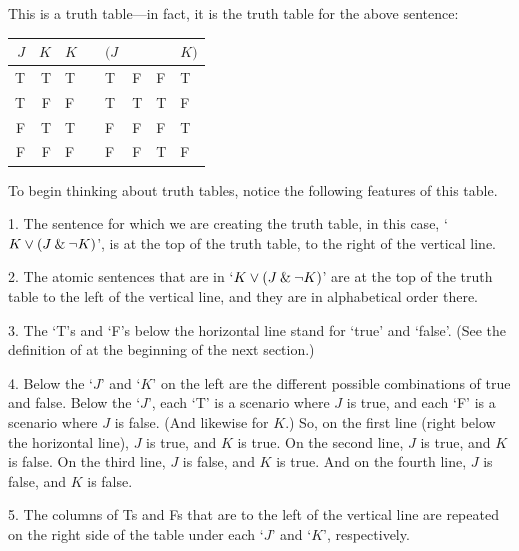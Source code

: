 This is a truth table---in fact, it is the truth table for the above sentence:

\begin{center}
\begin{tabular}{d d | f e e e e e}
$J$&$K$&  	$K$&\eor&$(J$&\eand&\enot&$K)$\\
\hline
 T & T & 	{T} & & {T} &F &F & {T}\Tstrut\\
 T & F & 	{F} & & {T} &T &T & {F}\\
 F & T & 	{T} & & {F} &F &F & {T}\\
 F & F & 	{F} & & {F} &F &T & {F}
\end{tabular}
\end{center}
To begin thinking about truth tables, notice the following features of this table.
\begin{earg}
\item[1.] The sentence for which we are creating the truth table, in this case, `$K \vee (J \mathbin{\&} {\neg} K)$', is at the top of the truth table, to the right of the vertical line.
\item[2.] The atomic sentences that are in `$K \vee (J \mathbin{\&} {\neg} K)$' are at the top of the truth table to the left of the vertical line, and they are in alphabetical order there. 
\item[3.] The `T's and `F's below the horizontal line stand for `true' and `false'. (See the definition of  at the beginning of the next section.)
\item[4.] Below the `$J$' and `$K$' on the left are the different possible combinations of true and false. Below the `$J$', each `T’ is a scenario where $J$ is true, and each `F’ is a scenario where $J$ is false. (And likewise for $K$.) So, on the first line (right below the horizontal line), $J$ is true, and $K$ is true. On the second line, $J$ is true, and $K$ is false. On the third line, $J$ is false, and $K$ is true. And on the fourth line, $J$ is false, and $K$ is false. 
\item[5.] The columns of Ts and Fs that are to the left of the vertical line are repeated on the right side of the table under each `$J$' and `$K$', respectively. 
\end{earg}

